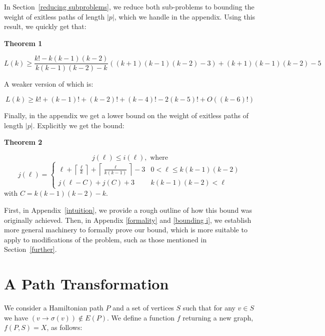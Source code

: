\documentclass{article}
\newcommand{\hide}[1]{}
\newcommand{\edit}[1]{}%
\newcommand{\dc}[1]{}%
\begin{document}
In Section~\ref{reducing subproblems}, we reduce both sub-problems to bounding the weight of exitless paths of length $|p|$, which we handle in the appendix. Using this result, we quickly get that:

\textbf{Theorem 1}\edit{ amsthm again}\dc{ label/ref since you will most likely state/prove this again later, but do amsthm first obviously}

\[ L(k) \geq \frac{k!-k(k-1)(k-2)}{k(k-1)(k-2)-k}((k+1)(k-1)(k-2)-3) + (k+1)(k-1)(k-2)-5 \]

A weaker version of which is:

\[ L(k) \geq k! +(k-1)!+(k-2)!+(k-4)!-2(k-5)!+O((k-6)!)\]\hide{continues 7(k-6)!-32(k-7)!... list of coefficients: [1,1,1,0,1,-2,7,-32,179,-1182,8993,-77440,744425,-7901410,...]}


Finally, in the appendix we get a lower bound on the weight of exitless paths of length $|p|$. Explicitly we get the bound:

\textbf{Theorem 2}\edit{ amsthm; not sure what to classify this result}

\[j(\ell) \le i(\ell), \text{ where}\]
\[j(\ell) = \begin{cases} 
\ell + \left\lceil \frac{\ell}{k}\right\rceil + \left\lceil \frac{\ell}{k(k-1)}\right\rceil -3 & 0 < \ell \leq k(k-1)(k-2)\\
j(\ell-C) + j(C)+3 & k(k-1)(k-2) < \ell
\end{cases} \]
with $C = k(k-1)(k-2)-k$.

First, in Appendix~\ref{intuition}, we provide a rough outline of how this bound was originally achieved. Then, in Appendix \ref{formality} and \ref{bounding i}, we establish more general machinery to formally prove our bound, which is more suitable to apply to modifications of the problem, such as those mentioned in Section~\ref{further}.

\section{A Path Transformation} \label{function}

We consider a Hamiltonian path $P$ and a set of vertices $S$ such that for any $v \in S$ we have $(v \to \sigma(v)) \not \in E(P)$. We define a function $f$ returning a new graph, $f(P, S)=X$, as follows: 

\vspace{1.75em}\dc{ use enumerate environment or algorithm environment (algorithm2e)}
\end{document}
